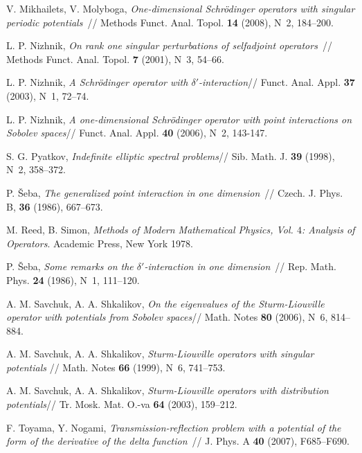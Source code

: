 \documentclass[11pt,english]{amsart}%
\begin{document}
\begin{thebibliography}{99}
V. Mikhailets, V. Molyboga, \textit{One-dimensional Schr\"odinger operators with singular
periodic potentials}~// Methods Funct. Anal. Topol. \textbf{14} (2008), N~2, 184--200.


L. P. Nizhnik, \textit{On rank one singular perturbations of selfadjoint operators}~//
Methods Funct. Anal. Topol. \textbf{7} (2001), N~3, 54--66.

L. P. Nizhnik, \textit{A Schr\"odinger operator with $\delta'$-interaction}// Funct. Anal. Appl. \textbf{37} (2003),
N~1, 72--74.

L. P. Nizhnik, \textit{A one-dimensional Schr\"odinger operator with point interactions on Sobolev spaces}// Funct. Anal. Appl. \textbf{40} (2006), N~2, 143-147.





S. G. Pyatkov, \textit{Indefinite elliptic spectral problems}//
 Sib. Math. J. \textbf{39} (1998), N~2, 358--372.

P. \v{S}eba,  \textit{The generalized point interaction in one dimension}~// Czech. J.
Phys. B, \textbf{36} (1986), 667--673.

M. Reed, B.  Simon, {\it  Methods of Modern Mathematical Physics, Vol. $4$: Analysis of
Operators}. Academic Press, New York 1978.

P. \v{S}eba, \textit{Some remarks on the $\delta'$-interaction in one dimension}~// Rep.
Math. Phys. \textbf{24} (1986), N~1, 111--120.

 A. M. Savchuk, A. A. Shkalikov, \textit{On the eigenvalues of the Sturm-Liouville operator with potentials from Sobolev spaces}// Math. Notes \textbf{80} (2006), N~6, 814--884.

A. M. Savchuk, A. A. Shkalikov, \textit{Sturm-Liouville operators with singular potentials }// Math. Notes \textbf{66} (1999),  N~6, 741--753.


A. M. Savchuk, A. A. Shkalikov, \textit{Sturm-Liouville operators with distribution potentials}// Tr. Mosk. Mat. O.-va  \textbf{64} (2003), 159--212.


F. Toyama, Y. Nogami, \textit{ Transmission-reflection problem with a potential of the
form of the derivative of the delta function}~// J. Phys. A \textbf{40} (2007),
F685--F690.





\end{thebibliography}
\end{document}
